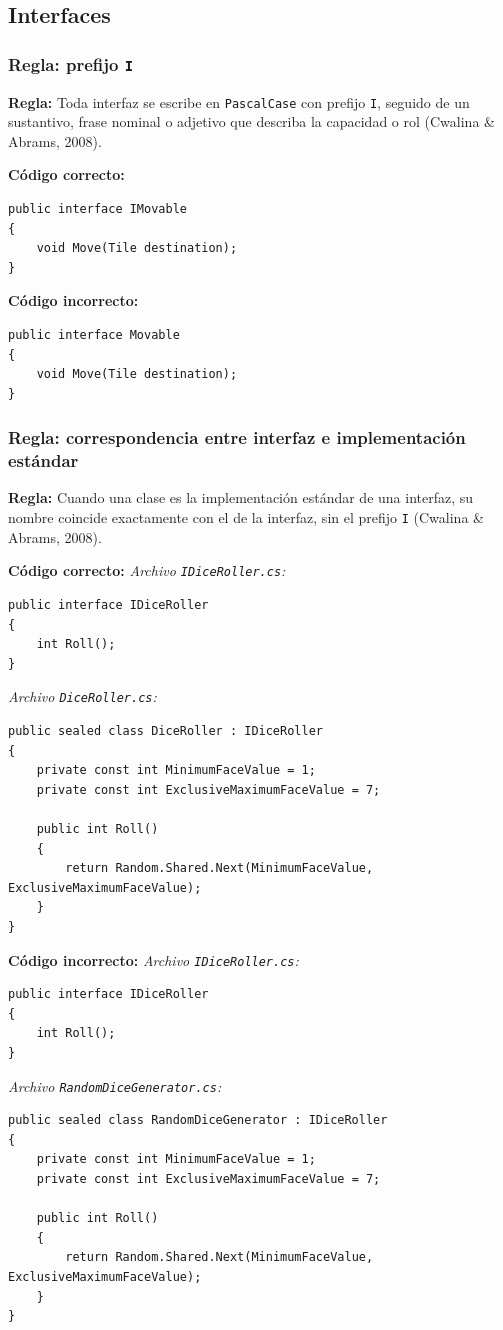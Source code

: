 \subsection{Interfaces}

\subsubsection{Regla: prefijo \texttt{I}}

\textbf{Regla:} Toda interfaz se escribe en \texttt{PascalCase} con prefijo \texttt{I}, seguido de un sustantivo, frase nominal o adjetivo que describa la capacidad o rol (Cwalina \& Abrams, 2008).

\textbf{Código correcto:}
\begin{lstlisting}[style=csharpstyle]
public interface IMovable
{
    void Move(Tile destination);
}
\end{lstlisting}

\textbf{Código incorrecto:}
\begin{lstlisting}[style=csharpstyle]
public interface Movable
{
    void Move(Tile destination);
}
\end{lstlisting}

\subsubsection{Regla: correspondencia entre interfaz e implementación estándar}

\textbf{Regla:} Cuando una clase es la implementación estándar de una interfaz, su nombre coincide exactamente con el de la interfaz, sin el prefijo \texttt{I} (Cwalina \& Abrams, 2008).

\textbf{Código correcto:}
\textit{Archivo \texttt{IDiceRoller.cs}:}
\begin{lstlisting}[style=csharpstyle]
public interface IDiceRoller
{
    int Roll();
}
\end{lstlisting}

\textit{Archivo \texttt{DiceRoller.cs}:}
\begin{lstlisting}[style=csharpstyle]
public sealed class DiceRoller : IDiceRoller
{
    private const int MinimumFaceValue = 1;
    private const int ExclusiveMaximumFaceValue = 7;

    public int Roll()
    {
        return Random.Shared.Next(MinimumFaceValue, ExclusiveMaximumFaceValue);
    }
}
\end{lstlisting}

\textbf{Código incorrecto:}
\textit{Archivo \texttt{IDiceRoller.cs}:}
\begin{lstlisting}[style=csharpstyle]
public interface IDiceRoller
{
    int Roll();
}
\end{lstlisting}

\textit{Archivo \texttt{RandomDiceGenerator.cs}:}
\begin{lstlisting}[style=csharpstyle]
public sealed class RandomDiceGenerator : IDiceRoller
{
    private const int MinimumFaceValue = 1;
    private const int ExclusiveMaximumFaceValue = 7;

    public int Roll()
    {
        return Random.Shared.Next(MinimumFaceValue, ExclusiveMaximumFaceValue);
    }
}
\end{lstlisting}
